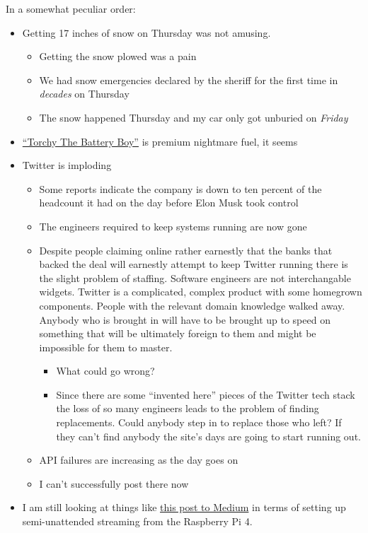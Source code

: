 In a somewhat peculiar order:

\begin{itemize}
\tightlist
\item
  Getting 17 inches of snow on Thursday was not amusing.

  \begin{itemize}
  \tightlist
  \item
    Getting the snow plowed was a pain
  \item
    We had snow emergencies declared by the sheriff for the first time
    in \emph{decades} on Thursday
  \item
    The snow happened Thursday and my car only got unburied on
    \emph{Friday}
  \end{itemize}
\item
  \href{https://en.wikipedia.org/w/index.php?title=Torchy_the_Battery_Boy&oldid=1114309923}{``Torchy
  The Battery Boy''} is premium nightmare fuel, it seems
\item
  Twitter is imploding

  \begin{itemize}
  \tightlist
  \item
    Some reports indicate the company is down to ten percent of the
    headcount it had on the day before Elon Musk took control
  \item
    The engineers required to keep systems running are now gone
  \item
    Despite people claiming online rather earnestly that the banks that
    backed the deal will earnestly attempt to keep Twitter running there
    is the slight problem of staffing. Software engineers are not
    interchangable widgets. Twitter is a complicated, complex product
    with some homegrown components. People with the relevant domain
    knowledge walked away. Anybody who is brought in will have to be
    brought up to speed on something that will be ultimately foreign to
    them and might be impossible for them to master.

    \begin{itemize}
    \tightlist
    \item
      What could go wrong?
    \item
      Since there are some ``invented here'' pieces of the Twitter tech
      stack the loss of so many engineers leads to the problem of
      finding replacements. Could anybody step in to replace those who
      left? If they can't find anybody the site's days are going to
      start running out.
    \end{itemize}
  \item
    API failures are increasing as the day goes on
  \item
    I can't successfully post there now
  \end{itemize}
\item
  I am still looking at things like
  \href{https://medium.com/illumination/livestreaming-to-twitch-using-a-command-prompt-92f5f862af16\#:~:text=Livestreaming\%20to\%20Twitch\%20Using\%20a\%20Command\%20Prompt\%201,command\%20...\%205\%20Step\%205\%3A\%20Go\%20Live\%21\%20}{this
  post to Medium} in terms of setting up semi-unattended streaming from
  the Raspberry Pi 4.


\end{itemize}
